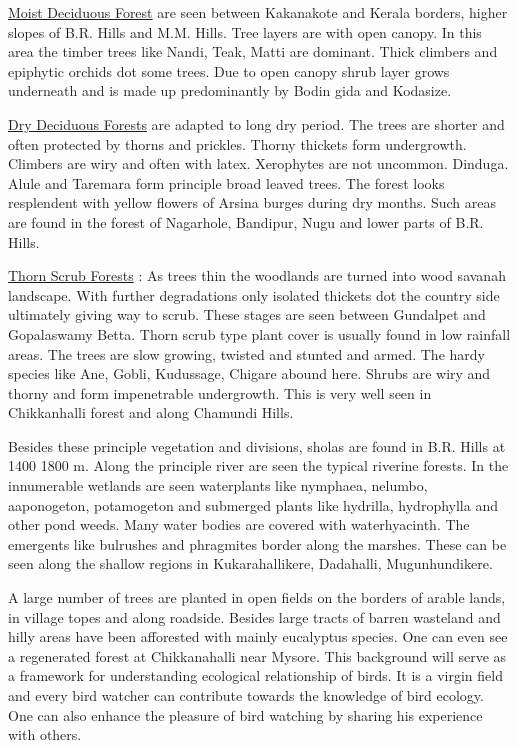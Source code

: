 \underline{Moist Deciduous Forest} are seen between Kakanakote and
Kerala borders, higher slopes of B.R. Hills and M.M. Hills. Tree 
layers are with open canopy. In this area the timber trees like 
Nandi, Teak, Matti are dominant. Thick climbers and epiphytic 
orchids dot some trees. Due to open canopy shrub layer grows 
underneath and is made up predominantly by Bodin gida and Kodasize. 

\vskip 0.1cm

\underline{Dry Deciduous Forests} are adapted to long dry period. The 
trees are shorter and often protected by thorns and prickles. 
Thorny thickets form undergrowth. Climbers are wiry and often 
with latex. Xerophytes are not uncommon. Dinduga. Alule and 
Taremara form principle broad leaved trees. The forest looks 
resplendent with yellow flowers of Arsina burges during dry 
months. Such areas are found in the forest of Nagarhole, Bandipur, 
Nugu and lower parts of B.R. Hills. 

\vskip 0.1cm

\underline{Thorn Scrub Forests} : As trees thin the woodlands are turned 
into wood savanah landscape. With further degradations only isolated 
thickets dot the country side ultimately giving way to 
scrub. These stages are seen between Gundalpet and Gopalaswamy 
Betta. Thorn scrub type plant cover is usually found in low 
rainfall areas. The trees are slow growing, twisted and stunted 
and armed. The hardy species like Ane, Gobli, Kudussage, Chigare 
abound here. Shrubs are wiry and thorny and form impenetrable 
undergrowth. This is very well seen in Chikkanhalli forest and 
along Chamundi Hills. 

\vskip 0.1cm

Besides these principle vegetation and divisions, sholas are 
found in B.R. Hills at 1400 1800 m. Along the principle river 
are seen the typical riverine forests. In the innumerable wetlands 
are seen waterplants like nymphaea, nelumbo, aaponogeton, 
potamogeton and submerged plants like hydrilla, hydrophylla and 
other pond weeds. Many water bodies are covered with waterhyacinth. 
The emergents like bulrushes and phragmites border along 
the marshes. These can be seen along the shallow regions in 
Kukarahallikere, Dadahalli, Mugunhundikere. 

\vskip 0.1cm

A large number of trees are planted in open fields on the 
borders of arable lands, in village topes and along roadside. Besides 
large tracts of barren wasteland and hilly areas have been 
afforested with mainly eucalyptus species. One can even see a 
regenerated forest at Chikkanahalli near Mysore. This background 
will serve as a framework for understanding ecological relationship 
of birds. It is a virgin field and every bird watcher can 
contribute towards the knowledge of bird ecology. One can also 
enhance the pleasure of bird watching by sharing his experience 
with others. 

